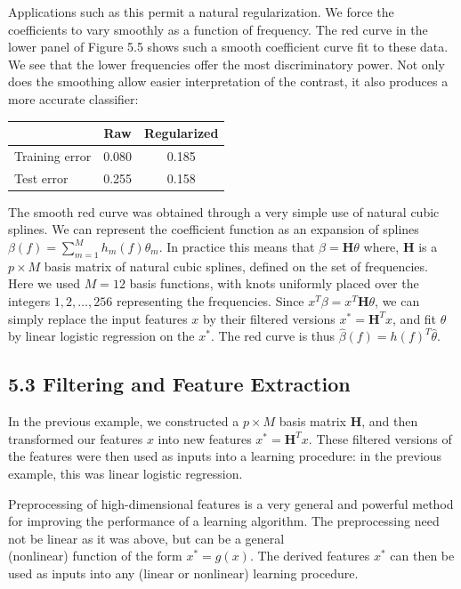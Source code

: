 \documentclass[10pt]{article}
\begin{document}
Applications such as this permit a natural regularization. We force the coefficients to vary smoothly as a function of frequency. The red curve in the lower panel of Figure 5.5 shows such a smooth coefficient curve fit to these data. We see that the lower frequencies offer the most discriminatory power. Not only does the smoothing allow easier interpretation of the contrast, it also produces a more accurate classifier:

\begin{center}
\begin{tabular}{l||c|c}
\hline
 & Raw & Regularized \\
\hline
Training error & 0.080 & 0.185 \\
Test error & 0.255 & 0.158 \\
\hline
\end{tabular}
\end{center}

The smooth red curve was obtained through a very simple use of natural cubic splines. We can represent the coefficient function as an expansion of splines $\beta(f)=\sum_{m=1}^{M} h_{m}(f) \theta_{m}$. In practice this means that $\beta=\mathbf{H} \theta$ where, $\mathbf{H}$ is a $p \times M$ basis matrix of natural cubic splines, defined on the set of frequencies. Here we used $M=12$ basis functions, with knots uniformly placed over the integers $1,2, \ldots, 256$ representing the frequencies. Since $x^{T} \beta=x^{T} \mathbf{H} \theta$, we can simply replace the input features $x$ by their filtered versions $x^{*}=\mathbf{H}^{T} x$, and fit $\theta$ by linear logistic regression on the $x^{*}$. The red curve is thus $\hat{\beta}(f)=h(f)^{T} \hat{\theta}$.

\subsection*{5.3 Filtering and Feature Extraction}
In the previous example, we constructed a $p \times M$ basis matrix $\mathbf{H}$, and then transformed our features $x$ into new features $x^{*}=\mathbf{H}^{T} x$. These filtered versions of the features were then used as inputs into a learning procedure: in the previous example, this was linear logistic regression.

Preprocessing of high-dimensional features is a very general and powerful method for improving the performance of a learning algorithm. The preprocessing need not be linear as it was above, but can be a general\\
(nonlinear) function of the form $x^{*}=g(x)$. The derived features $x^{*}$ can then be used as inputs into any (linear or nonlinear) learning procedure.
\end{document}
